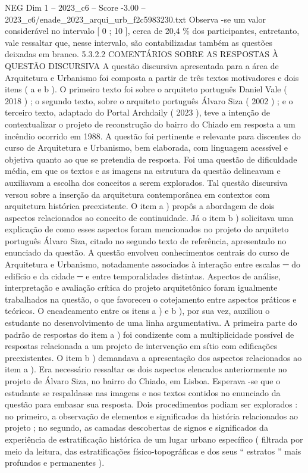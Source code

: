 \begin{textsample}{NEG Dim 1 – 2023\_c6 – Score -3.00 – 2023\_c6/enade\_2023\_arqui\_urb\_f2c5983230.txt}
Observa -se um valor considerável no intervalo [ 0 ; 10 ], cerca de 20,4 \% dos participantes, entretanto, vale ressaltar que, nesse intervalo, são contabilizadas também as questões deixadas em branco. 5.3.2.2 COMENTÁRIOS SOBRE AS RESPOSTAS À QUESTÃO DISCURSIVA A questão discursiva apresentada para a área de Arquitetura e Urbanismo foi composta a partir de três textos motivadores e dois itens ( a e b ).
O primeiro texto foi sobre o arquiteto português Daniel Vale ( 2018 ) ; o segundo texto, sobre o arquiteto português Álvaro Siza ( 2002 ) ; e o terceiro texto, adaptado do Portal Archdaily ( 2023 ), teve a intenção de contextualizar o projeto de reconstrução do bairro do Chiado em resposta a um incêndio ocorrido em 1988.
A questão foi pertinente e relevante para discentes do curso de Arquitetura e Urbanismo, bem elaborada, com linguagem acessível e objetiva quanto ao que se pretendia de resposta.
Foi uma questão de dificuldade média, em que os textos e as imagens na estrutura da questão delineavam e auxiliavam a escolha dos conceitos a serem explorados.
Tal questão discursiva versou sobre a inserção da arquitetura contemporânea em contextos com arquitetura histórica preexistente.
O item a ) propôs a abordagem de dois aspectos relacionados ao conceito de continuidade.
Já o item b ) solicitava uma explicação de como esses aspectos foram mencionados no projeto do arquiteto português Álvaro Siza, citado no segundo texto de referência, apresentado no enunciado da questão.
A questão envolveu conhecimentos centrais do curso de Arquitetura e Urbanismo, notadamente associados à interação entre escalas {\EmojiFont ─} do edifício e da cidade {\EmojiFont ─} e entre temporalidades distintas.
Aspectos de análise, interpretação e avaliação crítica do projeto arquitetônico foram igualmente trabalhados na questão, o que favoreceu o cotejamento entre aspectos práticos e teóricos.
O encadeamento entre os itens a ) e b ), por sua vez, auxiliou o estudante no desenvolvimento de uma linha argumentativa.
A primeira parte do padrão de respostas do item a ) foi condizente com a multiplicidade possível de respostas relacionada a um projeto de intervenção em sítio com edificações preexistentes.
O item b ) demandava a apresentação dos aspectos relacionados ao item a ).
Era necessário ressaltar os dois aspectos elencados anteriormente no projeto de Álvaro Siza, no bairro do Chiado, em Lisboa.
Esperava -se que o estudante se respaldasse nas imagens e nos textos contidos no enunciado da questão para embasar sua resposta.
Dois procedimentos podiam ser explorados : no primeiro, a observação de elementos e significados da história relacionados ao projeto ; no segundo, as camadas descobertas de signos e significados da experiência de estratificação histórica de um lugar urbano específico ( filtrada por meio da leitura, das estratificações físico-topográficas e dos seus “ estratos ” mais profundos e permanentes ).

\end{textsample}
